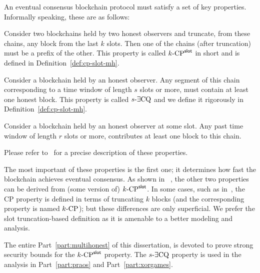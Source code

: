 An eventual consensus blockchain protocol 
must satisfy a set of key properties. Informally speaking, these are as follows:
\begin{description}[font=\normalfont\itshape\space]
  \item[Common Prefix Property (CP) with parameter $k$:]
  Consider two blockchains held by two honest observers and 
  truncate, from these chains, any block from the last $k$ slots. 
  Then one of the chains (after truncation) must be a prefix of the other. 
  This property is called ${k}\text{-}\mathrm{CP}^{\mathsf{slot}}$ in short and is defined in Definition~\ref{def:cp-slot-mh}. 

  \item[Chain Quality Property (CQ) with parameter $s$:]
  Consider a blockchain held by an honest observer. 
  Any segment of this chain 
  corresponding to a time window of length $s$ slots or more, 
  must contain at least one honest block.
  This property is called ${s}\text{-}\exists\mathrm{CQ}$ 
  and we define it rigorously in Definition~\ref{def:cp-slot-mh}. 

  \item[Chain Growth Property (CG) with parameter $r$:]
  Consider a blockchain held by an honest observer at some slot. 
  Any past time window of length $r$ slots or more, 
  contributes at least one block to this chain.
\end{description}
Please refer to~\cite{GKL,Ouroboros,Praos,Genesis,SnowWhite} for a precise description of these properties.


The most important of these properties is the first one; 
it determines how fast the blockchain achieves eventual consensus. 
As shown in ~\cite{Ouroboros}, 
the other two properties can be derived from (some version of) ${k}\text{-}\mathrm{CP}^{\mathsf{slot}}$.
In some cases, such as in~\cite{GKL,Ouroboros,SnowWhite}, 
the CP property is defined in terms of truncating $k$ blocks 
(and the corresponding property is named ${k}\text{-}\mathrm{CP}$); 
but these differences are only superficial. 
We prefer the slot truncation-based definition 
as it is amenable to a better modeling and analysis.


The entire Part~\ref{part:multihonest} of this dissertation, 
is devoted to prove strong security bounds for the ${k}\text{-}\mathrm{CP}^{\mathsf{slot}}$ property. 
The ${s}\text{-}\exists\mathrm{CQ}$ property is used in the analysis in 
Part~\ref{part:praos} and Part~\ref{part:xorgames}.







